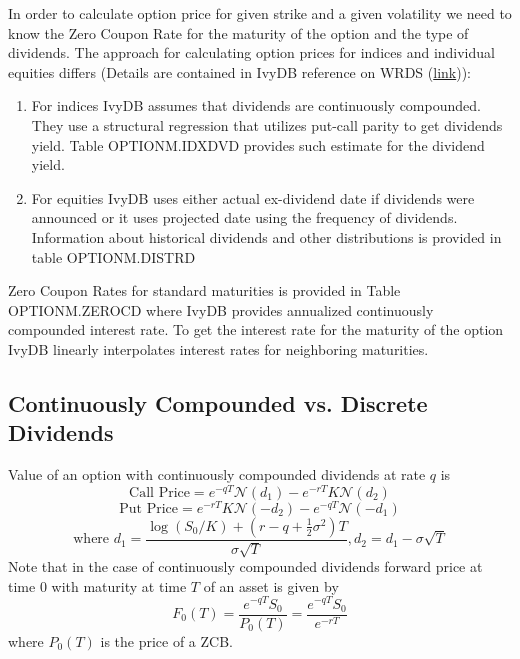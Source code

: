 \documentclass[12pt]{article}
\begin{document}
In order to calculate option price for given strike and a given volatility we need to know the Zero Coupon Rate for the maturity of the option and the type of dividends. The approach for calculating option prices for indices and individual equities differs (Details are contained in IvyDB reference on WRDS (\href{https://wrds-www.wharton.upenn.edu/documents/755/IvyDB_US_Reference_Manual.pdf}{link})):
\begin{enumerate}
	\item For indices IvyDB assumes that dividends are continuously compounded. They use a structural regression that utilizes put-call parity to get dividends yield. Table OPTIONM.IDXDVD provides such estimate for the dividend yield. 
	\item For equities IvyDB uses either actual ex-dividend date if dividends were announced or it uses projected date using the frequency of dividends. Information about historical dividends and other distributions is provided in table OPTIONM.DISTRD
\end{enumerate}


Zero Coupon Rates for standard maturities is provided in Table OPTIONM.ZEROCD where IvyDB provides annualized continuously compounded interest rate. To get the interest rate for the maturity of the option IvyDB linearly interpolates interest rates for neighboring maturities. 

\subsection{Continuously Compounded vs. Discrete Dividends}

Value of an option with continuously compounded dividends at rate $q$ is
\[\text{Call Price} = e^{-qT}\mathcal{N}(d_1)-e^{-rT}K\mathcal{N}(d_2)\]
\[\text{Put Price} = e^{-rT}K\mathcal{N}(-d_2) - e^{-qT}\mathcal{N}(-d_1)\]
\[\text{where } d_1 = \frac{\log(S_0/K) + (r - q + \frac{1}{2}\sigma^2)T}{\sigma\sqrt{T}}, d_2 = d_1 - \sigma\sqrt{T}\]
Note that in the case of continuously compounded dividends forward price at time $0$ with maturity at time $T$ of an asset is given by
\[F_0(T) = \frac{e^{-qT}S_0}{P_0(T)} = \frac{e^{-qT}S_0}{e^{-rT}}\]
where $P_0(T)$ is the price of a ZCB. 
\end{document}

